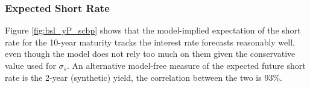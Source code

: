 {\subsubsection{Expected Short Rate}
\iftoggle{toclinks}{\gototoc}{} %

Figure \ref{fig:bsl_yP_scbp} shows that the model-implied expectation of the short rate for the 10-year maturity tracks the interest rate forecasts reasonably well, even though the model does not rely too much on them given the conservative value used for \(\sigma_s\).
An alternative model-free measure of the expected future short rate is the 2-year (synthetic) yield, the correlation between the two is 93\%.

%	



}
